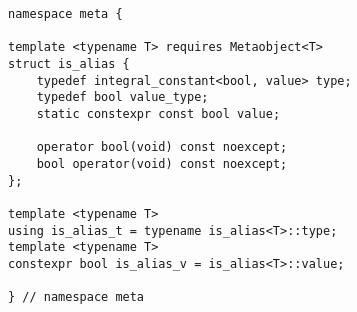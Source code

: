 
\begin{verbatim}
namespace meta {

template <typename T> requires Metaobject<T>
struct is_alias {
	typedef integral_constant<bool, value> type;
	typedef bool value_type;
	static constexpr const bool value;

	operator bool(void) const noexcept;
	bool operator(void) const noexcept;
};

template <typename T>
using is_alias_t = typename is_alias<T>::type;
template <typename T>
constexpr bool is_alias_v = is_alias<T>::value;

} // namespace meta
\end{verbatim}
